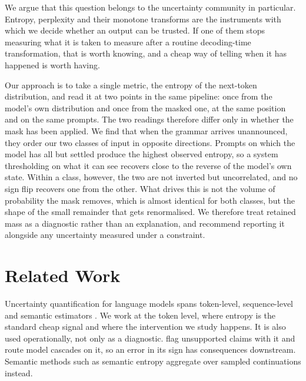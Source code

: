 \documentclass[11pt]{article}
\begin{document}
We argue that this question belongs to the uncertainty community in particular.
Entropy, perplexity and their monotone transforms are the instruments with which
we decide whether an output can be trusted. If one of them stops measuring what
it is taken to measure after a routine decoding-time transformation, that is
worth knowing, and a cheap way of telling when it has happened is worth having.

Our approach is to take a single metric, the entropy of the next-token
distribution, and read it at two points in the same pipeline: once from the
model's own distribution and once from the masked one, at the same position and
on the same prompts. The two readings therefore differ only in whether the mask
has been applied. We find that when the grammar arrives unannounced, they order
our two classes of input in opposite directions. Prompts on which the model has
all but settled produce the highest observed entropy, so a system thresholding on
what it can see recovers close to the reverse of the model's own state. Within a
class, however, the two are not inverted but uncorrelated, and no sign flip
recovers one from the other. What drives this is not the volume of probability
the mask removes, which is almost identical for both classes, but the shape of
the small remainder that gets renormalised. We therefore treat retained mass as a
diagnostic rather than an explanation, and recommend reporting it alongside any
uncertainty measured under a constraint.

\section{Related Work}
\label{sec:related}

Uncertainty quantification for language models spans token-level, sequence-level
and semantic estimators
\citep{liu-etal-2025-uncertainty,shorinwa-etal-2025-survey,vashurin-etal-2025-polygraph}.
We work at the token level, where entropy is the standard cheap signal
\citep{malinin-gales-2021-uncertainty,baan-etal-2023-uncertainty} and where the
intervention we study happens. It is also used operationally, not only as a
diagnostic. \citet{fadeeva-etal-2024-fact} flag unsupported claims with it and
\citet{gupta-etal-2024-cascades} route model cascades on it, so an error in its
sign has consequences downstream. Semantic methods such as semantic entropy
\citep{kuhn-etal-2023-semantic} aggregate over sampled continuations instead.
\end{document}
